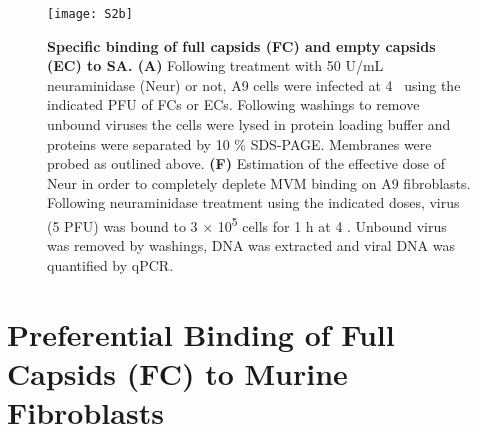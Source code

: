 \begin{figure}
\begin{minipage}{\textwidth}
\centering
\texttt{[image: S2b]} \\[0.3cm]
\caption[Specific Binding of Full Capsids (FC) and Empty Capsids (EC) to Sialic Acid (SA) ]{\textbf{Specific binding of full capsids (FC) and empty capsids (EC) to SA. (A)} Following treatment with 50 U/mL neuraminidase (Neur) or not, A9 cells were infected at 4 \textcelsius~using the indicated PFU of FCs or ECs\footnotemark. Following washings to remove unbound viruses the cells were lysed in protein loading buffer and proteins were separated by 10 \% SDS-PAGE. Membranes were probed as outlined above. \textbf{(F)} Estimation of the effective dose of Neur in order to completely deplete MVM binding on A9 fibroblasts. Following neuraminidase treatment using the indicated doses, virus (5 PFU) was bound to 3 $\times$ 10\textsuperscript{5} cells for 1 h at 4 \textcelsius. Unbound virus was removed by washings, DNA was extracted and viral DNA was quantified by qPCR.}

\label{S2b}
\vspace{0.9cm}

\end{minipage}

\end{figure}

\section{Preferential Binding of Full Capsids (FC) to Murine Fibroblasts}

